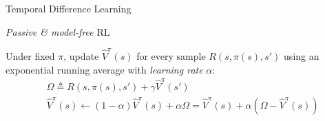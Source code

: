\documentclass{cognito}
\begin{document}
%

\begin{note}{Temporal Difference Learning}
	\begin{mdframed}[linecolor=black!25!white]
		\emph{Passive \& model-free} RL
	\end{mdframed}
	Under fixed $\pi$, update $\hat{V}^\pi(s)$ for every sample $R(s, \pi(s), s')$ using
	an exponential running average with \emph{learning rate} $\alpha$:
	\begin{align*}
		&\Omega \triangleq R(s, \pi(s), s') + \gamma \hat{V}^\pi(s')\\
		&\hat{V}^\pi(s) \leftarrow (1 - \alpha) \hat{V}^\pi(s) + \alpha \Omega = \hat{V}^\pi(s) + \alpha( \Omega - \hat{V}^\pi(s) )
	\end{align*}
	\vspace{-10pt}
\end{note}
\end{document}
